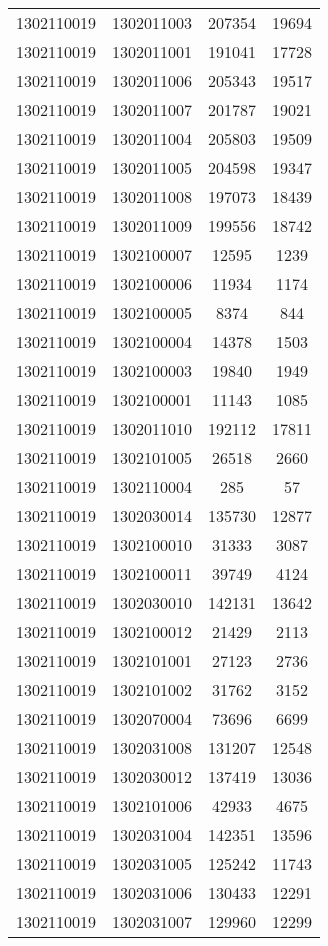 \begin{longtable}{llcc}
1302110019 & 1302011003 & 207354 & 19694\\
1302110019 & 1302011001 & 191041 & 17728\\
1302110019 & 1302011006 & 205343 & 19517\\
1302110019 & 1302011007 & 201787 & 19021\\
1302110019 & 1302011004 & 205803 & 19509\\
1302110019 & 1302011005 & 204598 & 19347\\
1302110019 & 1302011008 & 197073 & 18439\\
1302110019 & 1302011009 & 199556 & 18742\\
1302110019 & 1302100007 & 12595 & 1239\\
1302110019 & 1302100006 & 11934 & 1174\\
1302110019 & 1302100005 & 8374 & 844\\
1302110019 & 1302100004 & 14378 & 1503\\
1302110019 & 1302100003 & 19840 & 1949\\
1302110019 & 1302100001 & 11143 & 1085\\
1302110019 & 1302011010 & 192112 & 17811\\
1302110019 & 1302101005 & 26518 & 2660\\
1302110019 & 1302110004 & 285 & 57\\
1302110019 & 1302030014 & 135730 & 12877\\
1302110019 & 1302100010 & 31333 & 3087\\
1302110019 & 1302100011 & 39749 & 4124\\
1302110019 & 1302030010 & 142131 & 13642\\
1302110019 & 1302100012 & 21429 & 2113\\
1302110019 & 1302101001 & 27123 & 2736\\
1302110019 & 1302101002 & 31762 & 3152\\
1302110019 & 1302070004 & 73696 & 6699\\
1302110019 & 1302031008 & 131207 & 12548\\
1302110019 & 1302030012 & 137419 & 13036\\
1302110019 & 1302101006 & 42933 & 4675\\
1302110019 & 1302031004 & 142351 & 13596\\
1302110019 & 1302031005 & 125242 & 11743\\
1302110019 & 1302031006 & 130433 & 12291\\
1302110019 & 1302031007 & 129960 & 12299\\

\end{longtable}
